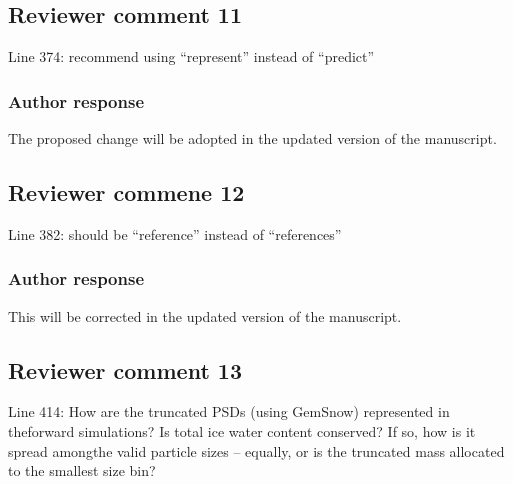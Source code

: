 \documentclass[11pt]{scrartcl}
\providecommand{\DIFadd}[1]{{\protect\textcolor{blue}{\uwave{#1}}}} %
\providecommand{\DIFdel}[1]{{\protect\textcolor{red}{\sout{#1}}}}                      %
\providecommand{\DIFaddbegin}{} %
\providecommand{\DIFaddend}{} %
\providecommand{\DIFdelbegin}{} %
\providecommand{\DIFdelend}{} %
\newenvironment{change}[1][]{%
  \begin{mdframed}[frametitle={Line #1:}]%
}{%
  \end{mdframed}%
}
\begin{document}
\subsection*{Reviewer comment 11}
 Line 374: recommend using “represent” instead of “predict”

\subsubsection*{Author response}

The proposed change will be adopted in the updated version of the manuscript.


\subsection*{Reviewer commene 12}

 Line 382: should be “reference” instead of “references”

\subsubsection*{Author response}
This will be corrected in the updated version of the manuscript.


\subsection*{Reviewer comment 13}

Line  414:  How  are  the  truncated  PSDs  (using  GemSnow)  represented  in  theforward simulations? Is total ice water content conserved? If so, how is it spread amongthe valid particle sizes – equally, or is the truncated mass allocated to the smallest size bin?
\end{document}
